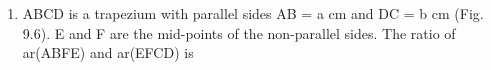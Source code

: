 \documentclass{article}
\begin{document}
\begin{enumerate}
\begin{enumerate}
\end{enumerate}
\item ABCD is a trapezium with parallel sides AB = a cm and DC = b cm (Fig. 9.6). E and F are the mid-points of the non-parallel sides. The ratio of ar(ABFE) and ar(EFCD) is
\end{enumerate}
\end{document}
